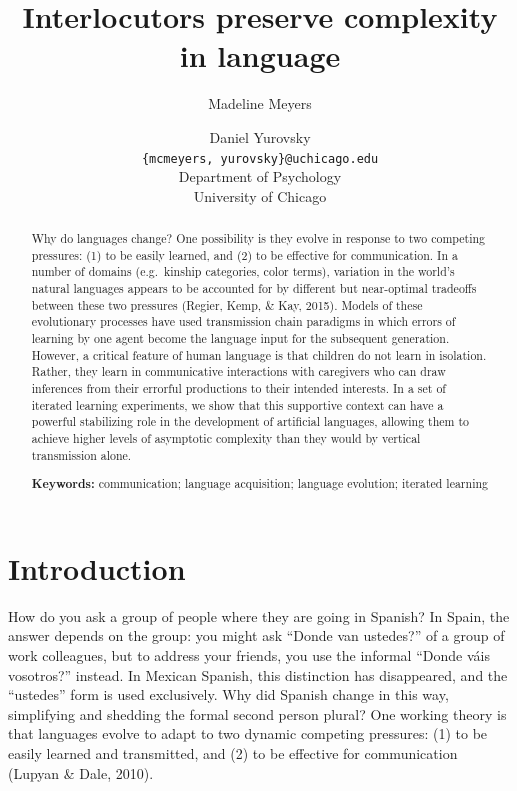 \documentclass[10pt, letterpaper]{article}
\title{Interlocutors preserve complexity in language}
\author{Madeline Meyers \and Daniel Yurovsky \\
        \texttt{\{mcmeyers, yurovsky\}@uchicago.edu} \\
       Department of Psychology \\ University of Chicago}
\begin{document}
\maketitle

\begin{abstract}
Why do languages change? One possibility is they evolve in response to
two competing pressures: (1) to be easily learned, and (2) to be
effective for communication. In a number of domains (e.g.~kinship
categories, color terms), variation in the world's natural languages
appears to be accounted for by different but near-optimal tradeoffs
between these two pressures (Regier, Kemp, \& Kay, 2015). Models of
these evolutionary processes have used transmission chain paradigms in
which errors of learning by one agent become the language input for the
subsequent generation. However, a critical feature of human language is
that children do not learn in isolation. Rather, they learn in
communicative interactions with caregivers who can draw inferences from
their errorful productions to their intended interests. In a set of
iterated learning experiments, we show that this supportive context can
have a powerful stabilizing role in the development of artificial
languages, allowing them to achieve higher levels of asymptotic
complexity than they would by vertical transmission alone.

\textbf{Keywords:}
communication; language acquisition; language evolution; iterated
learning
\end{abstract}

\section{Introduction}\label{introduction}

How do you ask a group of people where they are going in Spanish? In
Spain, the answer depends on the group: you might ask ``Donde van
ustedes?'' of a group of work colleagues, but to address your friends,
you use the informal ``Donde váis vosotros?'' instead. In Mexican
Spanish, this distinction has disappeared, and the ``ustedes'' form is
used exclusively. Why did Spanish change in this way, simplifying and
shedding the formal second person plural? One working theory is that
languages evolve to adapt to two dynamic competing pressures: (1) to be
easily learned and transmitted, and (2) to be effective for
communication (Lupyan \& Dale, 2010).
\end{document}
